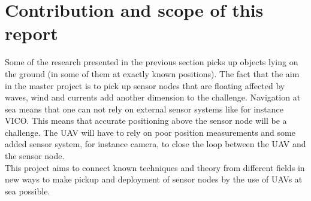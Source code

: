 \section{Contribution and scope of this report}
Some of the research presented in the previous section picks up objects lying on the ground (in some of them at exactly known positions). The fact that the aim in the master project is to pick up sensor nodes that are floating affected by waves, wind and currents add another dimension to the challenge. Navigation at sea means that one can not rely on external sensor systems like for instance VICO. This means that accurate positioning above the sensor node will be a challenge. The UAV will have to rely on poor position measurements and some added sensor system, for instance camera, to close the loop between the UAV and the sensor node.\\
\newline
This project aims to connect known techniques and theory from different fields in new ways to make pickup and deployment of sensor nodes by the use of UAVs at sea possible.
